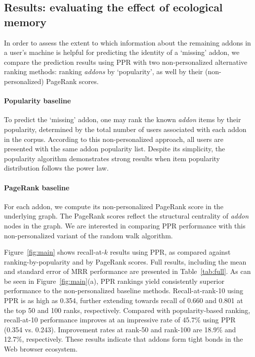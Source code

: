 \documentclass[ijoc,nonblindrev]{informs3} %
\numberwithin{equation}{subsection}
\begin{document}
\subsection{Results: evaluating the effect of ecological memory}
\label{sec:user_main_results}

In order to assess the extent to which information about the remaining addons in a user's machine is helpful for predicting the identity of a `missing' addon, we compare the prediction results using PPR with two non-personalized alternative ranking methods: ranking {\it addons} by `popularity', as well by their (non-personalized) PageRank scores. 

\paragraph{Popularity baseline} 

To predict the `missing' addon, one may rank the known {\it addon} items by their popularity, determined by the total number of users associated with each addon in the corpus. According to this non-personalized approach, all users are presented with the same addon popularity list. Despite its simplicity, the popularity algorithm demonstrates strong results when item popularity distribution follows the power law. 

\paragraph{PageRank baseline} 

For each addon, we compute its non-personalized PageRank score in the underlying graph. The PageRank scores reflect the structural centrality of {\it addon} nodes in the graph. We are interested in comparing PPR performance with this non-personalized variant of the random walk algorithm.

Figure~\ref{fig:main} shows recall-at-$k$ results using PPR, as compared against ranking-by-popularity and by PageRank scores. Full results, including the mean and standard error of MRR performance are presented in Table~\ref{tab:full}. As can be seen in Figure~\ref{fig:main}(a), PPR rankings yield consistently superior performance to the non-personalized baseline methods. Recall-at-rank-10 using PPR is as high as 0.354, further extending towards recall of 0.660 and 0.801 at the top 50 and 100 ranks, respectively. Compared with popularity-based ranking, recall-at-10 performance improves at an impressive rate of 45.7\% using PPR (0.354 vs. 0.243). Improvement rates at rank-50 and rank-100 are 18.9\% and 12.7\%, respectively. These results indicate that addons form tight bonds in the Web browser ecosystem. 
\end{document}
